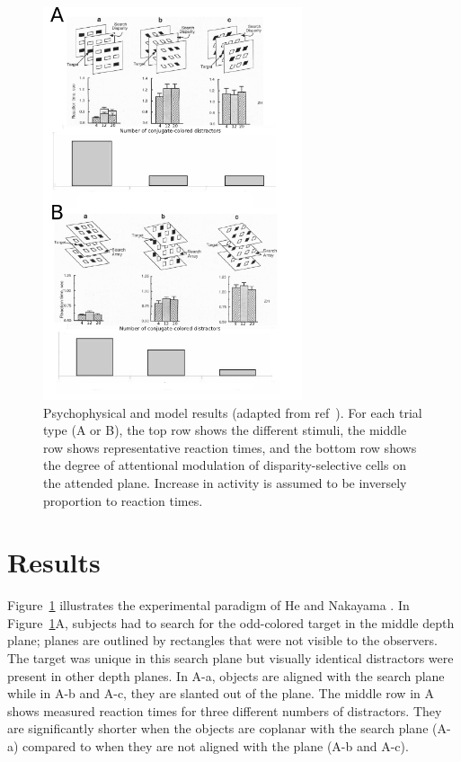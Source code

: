 \documentclass[conference]{IEEEtran}
\begin{document}
\begin{figure}[h!]
\centering
\includegraphics[width=3in]{figs/nakayama}
\caption{Psychophysical and model results (adapted from
  ref~\cite{He_Nakayama95}). For each trial type (A or B), the top row
  shows the different stimuli, the middle row
  shows representative reaction times, and the bottom row shows the
  degree of attentional modulation of disparity-selective cells on the
  attended plane. Increase in activity is assumed to be inversely
  proportion to reaction times.} 
\vspace{-11pt}
\label{ModelResults}
\end{figure}

\section{Results}
Figure~\ref{ModelResults} illustrates the experimental paradigm of He
and Nakayama \cite{He_Nakayama95}.
In Figure~\ref{ModelResults}A, subjects
had to search for the odd-colored target in the middle depth
plane; planes are outlined by rectangles that were not visible to the observers. The target was unique in
this search plane but visually identical distractors
 were present in other depth
planes. In A-a, objects are aligned with the search plane while in A-b
and A-c, they are slanted out of the plane. The
middle row in A shows measured reaction times for three different
numbers of distractors.
They are significantly shorter when the objects are coplanar with the search plane (A-a) compared to when they are not aligned with the plane (A-b and A-c).
\end{document}
